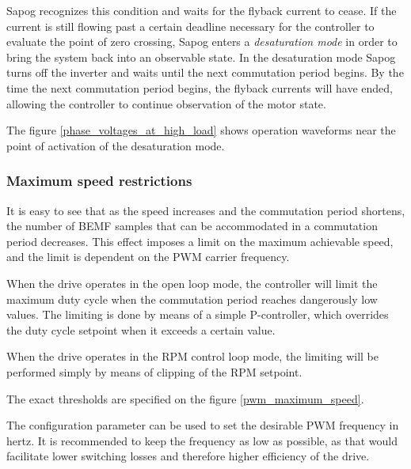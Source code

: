 \documentclass{zubaxdoc}
\begin{document}
Sapog recognizes this condition and waits for the flyback current to cease.
If the current is still flowing past a certain deadline necessary for the controller to evaluate the
point of zero crossing, Sapog enters a \emph{desaturation mode} in order to bring the system
back into an observable state.
In the desaturation mode Sapog turns off the inverter and waits until the next commutation period begins.
By the time the next commutation period begins, the flyback currents will have ended,
allowing the controller to continue observation of the motor state.

The figure \ref{phase_voltages_at_high_load} shows operation waveforms near the point of activation
of the desaturation mode.

\subsubsection{Maximum speed restrictions}

It is easy to see that as the speed increases and the commutation period shortens,
the number of BEMF samples that can be accommodated in a commutation period decreases.
This effect imposes a limit on the maximum achievable speed,
and the limit is dependent on the PWM carrier frequency.

When the drive operates in the open loop mode, the controller will limit the maximum duty cycle
when the commutation period reaches dangerously low values.
The limiting is done by means of a simple P-controller,
which overrides the duty cycle setpoint when it exceeds a certain value.

When the drive operates in the RPM control loop mode, the limiting will be performed simply by means of
clipping of the RPM setpoint.

The exact thresholds are specified on the figure \ref{pwm_maximum_speed}.

The configuration parameter  can be used to set the desirable PWM frequency
in hertz.
It is recommended to keep the frequency as low as possible,
as that would facilitate lower switching losses and therefore higher efficiency of the drive.
\end{document}
